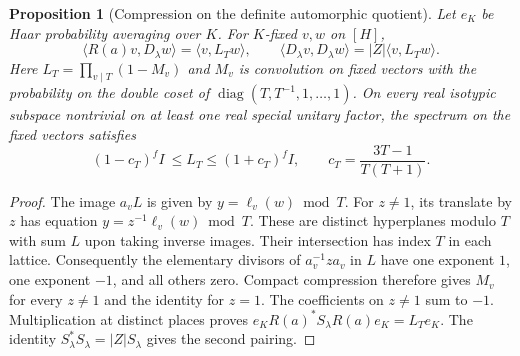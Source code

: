 \documentclass[a4paper,11pt]{article}
\newtheorem{proposition}{Proposition}[section]
\theoremstyle{definition}
\theoremstyle{remark}
\numberwithin{equation}{section}
\begin{document}
\begin{proposition}[Compression on the definite automorphic quotient]\leavevmode
\label{prop:corehecke272}
Let \(e_K\) be Haar probability averaging over \(K\).
For \(K\)-fixed \(v,w\) on \([H]\),
\[
 \langle R(a)v,D_\lambda w\rangle=\langle v,L_Tw\rangle,\qquad
 \langle D_\lambda v,D_\lambda w\rangle
                  =|Z|\langle v,L_Tw\rangle .
\]
Here \(L_T=\prod_{v\mid T}(1-M_v)\) and \(M_v\) is convolution
on fixed vectors with the probability on the double coset of
\(\operatorname{diag}(T,T^{-1},1,\ldots,1)\).
On every real isotypic subspace nontrivial on at least one real
special unitary factor, the spectrum on the fixed vectors satisfies
\[
          (1-c_T)^f I\ \le L_T\le (1+c_T)^f I,\qquad
                  c_T=\frac{3T-1}{T(T+1)} .
\]
\end{proposition}
\begin{proof}
The image \(a_v L\) is given by \(y=\ell_v(w)\bmod T\).
For \(z\ne1\), its translate by \(z\) has equation
\(y=z^{-1}\ell_v(w)\bmod T\). These are distinct hyperplanes
modulo \(T\) with sum \(L\) upon taking inverse images. Their
intersection has index \(T\) in each lattice. Consequently the
elementary divisors of \(a_v^{-1}za_v\) in \(L\) have one exponent
\(1\), one exponent \(-1\), and all others zero. Compact compression
therefore gives \(M_v\) for every \(z\ne1\) and the identity
for \(z=1\). The coefficients on \(z\ne1\) sum to \(-1\).
Multiplication at distinct places proves
\(e_K R(a)^\ast S_\lambda R(a)e_K=L_T e_K\).
The identity \(S_\lambda^\ast S_\lambda=|Z|S_\lambda\) gives the
second pairing.


\end{proof}
\end{document}
